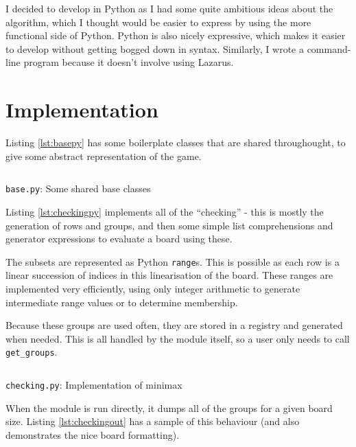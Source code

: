 \documentclass[fleqn,a4paper,11pt]{article}
\begin{document}
    I decided to develop in Python as I had some quite ambitious ideas about the
    algorithm, which I thought would be easier to express by using the more
    functional side of Python. Python is also nicely expressive, which makes it
    easier to develop without getting bogged down in syntax. Similarly, I wrote
    a command-line program because it doesn't involve using Lazarus.

    \section{Implementation}

    Listing \ref{lst:basepy} has some boilerplate classes that are shared
    throughought, to give some abstract representation of the game.

\begin{longlisting}
\inputminted{python}{../src/base.py}
\caption{\texttt{base.py}: Some shared base classes}
\label{lst:basepy}
\end{longlisting}

    Listing \ref{lst:checkingpy} implements all of the ``checking'' - this is
    mostly the generation of rows and groups, and then some simple list
    comprehensions and generator expressions to evaluate a board using these.

    The subsets are represented as Python \texttt{range}s. This is possible as
    each row is a linear succession of indices in this linearisation of the
    board. These ranges are implemented very efficiently, using only integer
    arithmetic to generate intermediate range values or to determine membership.

    Because these groups are used often, they are stored in a registry and
    generated when needed. This is all handled by the module itself, so a user
    only needs to call \texttt{get\_groups}.

\begin{longlisting}
\inputminted{python}{../src/checking.py}
\caption{\texttt{checking.py}: Implementation of minimax}
\label{lst:checkingpy}
\end{longlisting}

    When the module is run directly, it dumps all of the groups for a given
    board size. Listing \ref{lst:checkingout} has a sample of this behaviour
    (and also demonstrates the nice board formatting).
\end{document}
